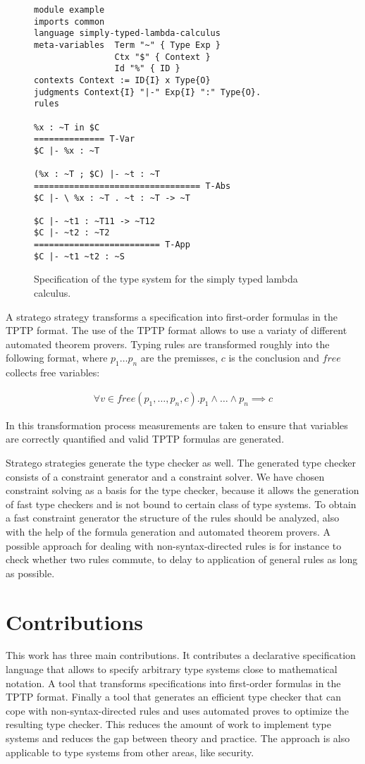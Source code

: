 \documentclass{acm_proc_article-sp}
\begin{document}
\begin{figure}
\begin{verbatim}
module example
imports common
language simply-typed-lambda-calculus
meta-variables 	Term "~" { Type Exp }
                Ctx "$" { Context }
                Id "%" { ID }
contexts Context := ID{I} x Type{O}
judgments Context{I} "|-" Exp{I} ":" Type{O}.
rules

%x : ~T in $C
============== T-Var
$C |- %x : ~T

(%x : ~T ; $C) |- ~t : ~T
================================= T-Abs
$C |- \ %x : ~T . ~t : ~T -> ~T

$C |- ~t1 : ~T11 -> ~T12
$C |- ~t2 : ~T2
========================= T-App
$C |- ~t1 ~t2 : ~S
\end{verbatim}
\caption{Specification of the type system for the simply typed lambda
  calculus.}
\label{fig:example-specification}
\end{figure}

A stratego strategy transforms a specification into first-order
formulas in the TPTP \cite{Sutcliffe04tstpdata-exchange} format. The
use of the TPTP format allows to use a variaty of different automated
theorem provers. Typing rules are transformed roughly into the
following format, where $p_1 \dots p_n$ are the premisses, $c$ is the
conclusion and $free$ collects free variables:

\begin{align}
  \forall v \in free(p_1, \dots, p_n, c) . p_1 \land \dots \land p_n \implies  c 
\end{align}

In this transformation process measurements are taken to ensure that
variables are correctly quantified and valid TPTP formulas are
generated.

Stratego strategies generate the type checker as well. The generated
type checker consists of a constraint generator and a constraint
solver. We have chosen constraint solving as a basis for the type
checker, because it allows the generation of fast type checkers and is
not bound to certain class of type systems. To obtain a fast
constraint generator the structure of the rules should be analyzed,
also with the help of the formula generation and automated theorem
provers. A possible approach for dealing with non-syntax-directed
rules is for instance to check whether two rules commute, to delay to
application of general rules as long as possible.
\section{Contributions}
This work has three main contributions. It contributes a declarative
specification language that allows to specify arbitrary type systems
close to mathematical notation. A tool that transforms specifications
into first-order formulas in the TPTP format. Finally a tool that
generates an efficient type checker that can cope with
non-syntax-directed rules and uses automated proves to optimize the
resulting type checker. This reduces the amount of work to implement
type systems and reduces the gap between theory and practice. The
approach is also applicable to type systems from other areas, like
security.
\end{document}

